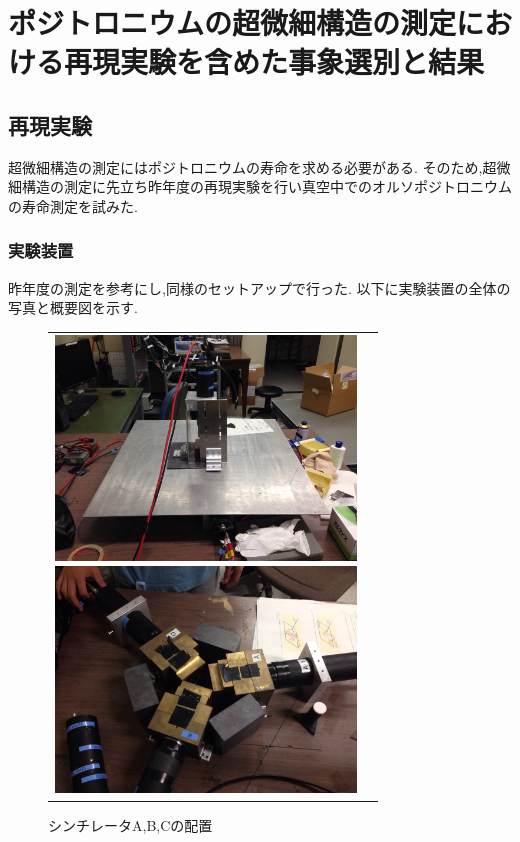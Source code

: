 \chapter{ポジトロニウムの超微細構造の測定における再現実験を含めた事象選別と結果}\label{result}

\section{再現実験}
超微細構造の測定にはポジトロニウムの寿命を求める必要がある.
そのため,超微細構造の測定に先立ち昨年度の再現実験を行い真空中でのオルソポジトロニウムの寿命測定を試みた.

\subsection{実験装置}
昨年度の測定を参考にし,同様のセットアップで行った.
以下に実験装置の全体の写真と概要図を示す.\\
\begin{figure}[htbp]
	\begin{tabular}{cc}
		\begin{minipage}{0.5\hsize}
			\begin{center}
				\includegraphics[width=80mm]{img/isb/setting_overview.JPG}
				\caption{装置の全体写真}
				\label{fig:setting2015}
			\end{center}
		\end{minipage}
		\begin{minipage}{0.5\hsize}
			\begin{center}
				\includegraphics[width=80mm]{img/isb/pmt_setting}
				\caption{シンチレータA,B,Cの配置}
				\label{fig:pmt_setting2015}
			\end{center}
		\end{minipage}
	\end{tabular}
\end{figure}

